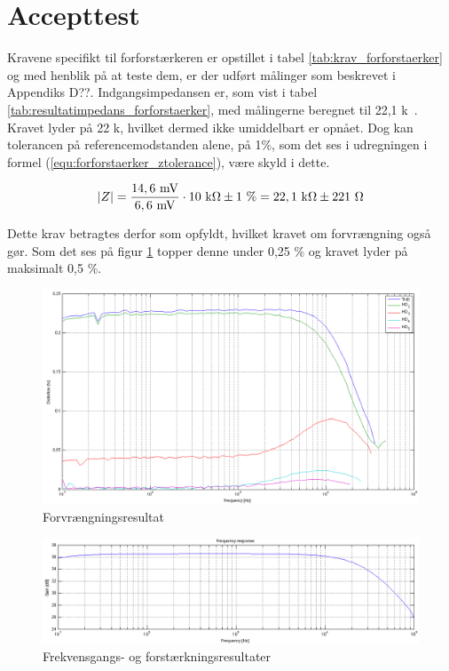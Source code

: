 \section{Accepttest}
\label{forforstaerker_accepttest}

Kravene specifikt til forforstærkeren er opstillet i tabel \ref{tab:krav_forforstaerker} og med henblik på at teste dem, er der udført målinger som beskrevet i Appendiks D??. Indgangsimpedansen er, som vist i tabel \ref{tab:resultatimpedans_forforstaerker}, med målingerne beregnet til 22,1 k\ohm~. Kravet lyder på 22 k\ohm, hvilket dermed ikke umiddelbart er opnået. Dog kan tolerancen på referencemodstanden alene, på 1\%, som det ses i udregningen i formel (\ref{equ:forforstaerker_ztolerance}), være skyld i dette.

\begin{equation}
\label{equ:forforstaerker_ztolerance}
\vert Z \vert = \frac{\mathrm{14,6~mV}}{\mathrm{6,6~mV}} \cdot \mathrm{10~k\ohm} \pm 1~\% =  \mathrm{22,1~k\ohm} \pm 221~\ohm
\end{equation}

Dette krav betragtes derfor som opfyldt, hvilket kravet om forvrængning også gør. Som det ses på figur \ref{fig:accepttest-thdresultat-forforstaerker} topper denne under 0,25 \% og kravet lyder på maksimalt 0,5 \%. 

\begin{figure}[h]
\centering
\includegraphics[width=\textwidth]{maalerapporter/forforstaerker/thd-forforstaerker.png}
\caption{Forvrængningsresultat}
\label{fig:accepttest-thdresultat-forforstaerker}
\end{figure}

\begin{figure}[h]
\centering
\includegraphics[width=\textwidth]{maalerapporter/forforstaerker/frekvensrespons-forforstaerker.png}
\caption{Frekvensgangs- og forstærkningsresultater}
\label{fig:accepttest-fresultat-forforstaerker}
\end{figure}

